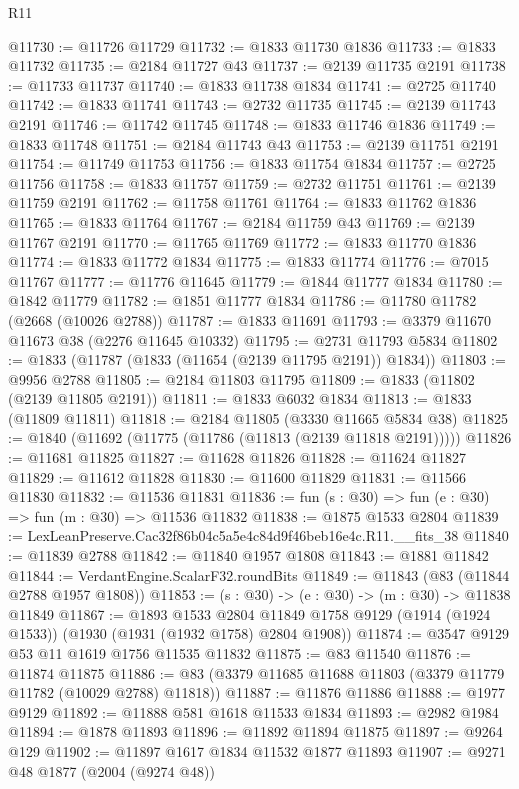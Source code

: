 \begin{lexlean}{R11}
\begin{coremodule}
@11730 := @11726 @11729
@11732 := @1833 @11730 @1836
@11733 := @1833 @11732
@11735 := @2184 @11727 @43
@11737 := @2139 @11735 @2191
@11738 := @11733 @11737
@11740 := @1833 @11738 @1834
@11741 := @2725 @11740
@11742 := @1833 @11741
@11743 := @2732 @11735
@11745 := @2139 @11743 @2191
@11746 := @11742 @11745
@11748 := @1833 @11746 @1836
@11749 := @1833 @11748
@11751 := @2184 @11743 @43
@11753 := @2139 @11751 @2191
@11754 := @11749 @11753
@11756 := @1833 @11754 @1834
@11757 := @2725 @11756
@11758 := @1833 @11757
@11759 := @2732 @11751
@11761 := @2139 @11759 @2191
@11762 := @11758 @11761
@11764 := @1833 @11762 @1836
@11765 := @1833 @11764
@11767 := @2184 @11759 @43
@11769 := @2139 @11767 @2191
@11770 := @11765 @11769
@11772 := @1833 @11770 @1836
@11774 := @1833 @11772 @1834
@11775 := @1833 @11774
@11776 := @7015 @11767
@11777 := @11776 @11645
@11779 := @1844 @11777 @1834
@11780 := @1842 @11779
@11782 := @1851 @11777 @1834
@11786 := @11780 @11782 (@2668 (@10026 @2788))
@11787 := @1833 @11691
@11793 := @3379 @11670 @11673 @38 (@2276 @11645 @10332)
@11795 := @2731 @11793 @5834
@11802 := @1833 (@11787 (@1833 (@11654 (@2139 @11795 @2191)) @1834))
@11803 := @9956 @2788
@11805 := @2184 @11803 @11795
@11809 := @1833 (@11802 (@2139 @11805 @2191))
@11811 := @1833 @6032 @1834
@11813 := @1833 (@11809 @11811)
@11818 := @2184 @11805 (@3330 @11665 @5834 @38)
@11825 := @1840 (@11692 (@11775 (@11786 (@11813 (@2139 @11818 @2191)))))
@11826 := @11681 @11825
@11827 := @11628 @11826
@11828 := @11624 @11827
@11829 := @11612 @11828
@11830 := @11600 @11829
@11831 := @11566 @11830
@11832 := @11536 @11831
@11836 := fun (s : @30) => fun (e : @30) => fun (m : @30) => @11536 @11832
@11838 := @1875 @1533 @2804
@11839 := LexLeanPreserve.Cac32f86b04c5a5e4c84d9f46beb16e4c.R11.__fits_38
@11840 := @11839 @2788
@11842 := @11840 @1957 @1808
@11843 := @1881 @11842
@11844 := VerdantEngine.ScalarF32.roundBits
@11849 := @11843 (@83 (@11844 @2788 @1957 @1808))
@11853 := (s : @30) -> (e : @30) -> (m : @30) -> @11838 @11849
@11867 := @1893
    @1533
    @2804
    @11849
    @1758
    @9129
    (@1914 (@1924 @1533))
    (@1930 (@1931 (@1932 @1758) @2804 @1908))
@11874 := @3547 @9129 @53 @11 @1619 @1756 @11535 @11832
@11875 := @83 @11540
@11876 := @11874 @11875
@11886 := @83 (@3379 @11685 @11688 @11803 (@3379 @11779 @11782 (@10029 @2788) @11818))
@11887 := @11876 @11886
@11888 := @1977 @9129
@11892 := @11888 @581 @1618 @11533 @1834
@11893 := @2982 @1984
@11894 := @1878 @11893
@11896 := @11892 @11894 @11875
@11897 := @9264 @129
@11902 := @11897 @1617 @1834 @11532 @1877 @11893
@11907 := @9271 @48 @1877 (@2004 (@9274 @48))

\end{coremodule}
\end{lexlean}
